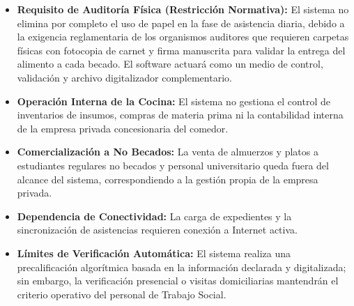 \begin{itemize}
    \item \textbf{Requisito de Auditoría Física (Restricción Normativa):} El sistema no elimina por completo el uso de papel en la fase de asistencia diaria, debido a la exigencia reglamentaria de los organismos auditores que requieren carpetas físicas con fotocopia de carnet y firma manuscrita para validar la entrega del alimento a cada becado. El software actuará como un medio de control, validación y archivo digitalizador complementario.

    \item \textbf{Operación Interna de la Cocina:} El sistema no gestiona el control de inventarios de insumos, compras de materia prima ni la contabilidad interna de la empresa privada concesionaria del comedor.

    \item \textbf{Comercialización a No Becados:} La venta de almuerzos y platos a estudiantes regulares no becados y personal universitario queda fuera del alcance del sistema, correspondiendo a la gestión propia de la empresa privada.

    \item \textbf{Dependencia de Conectividad:} La carga de expedientes y la sincronización de asistencias requieren conexión a Internet activa.

    \item \textbf{Límites de Verificación Automática:} El sistema realiza una precalificación algorítmica basada en la información declarada y digitalizada; sin embargo, la verificación presencial o visitas domiciliarias mantendrán el criterio operativo del personal de Trabajo Social.
\end{itemize}
